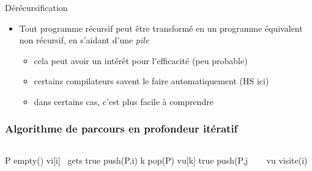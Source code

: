 
\begin{frame}{Dérécursification}

\begin{itemize}
    \item Tout programme récursif peut être transformé en un programme équivalent non récursif, en s'aidant d'une \emph{pile} 
    \begin{itemize}
        \item cela peut avoir un intérêt pour l'efficacité (peu probable)
        \item certains compilateurs savent le faire automatiquement (HS ici) 
        \item dans certains cas, c'est plus facile à comprendre 
    \end{itemize}
\end{itemize}
\end{frame}

\begin{frame}[fragile]
    \frametitle{Algorithme de parcours en profondeur itératif}
        \begin{columns}
            \begin{column}{.55\textwidth}
                \begin{algorithmic}
                    \State P \gets empty() 
                    \State vi[i] \ gets true 
                    \State push(P,i) 
                        \State k \gets pop(P)
                            \State vu[k] \gets true 
                            \State push(P,j
                            \EndIf
                        \EndFor
                    \EndWhile
                    \EndFunction
                \end{algorithmic}
            \end{column}
            \begin{column}{.45\textwidth}
                \begin{algorithmic}
                    \State vu 
                            \State visite(i)
                        \EndIf
                    \EndFor
                \end{algorithmic}            
            \end{column}
        \end{columns}    
    \end{frame}

